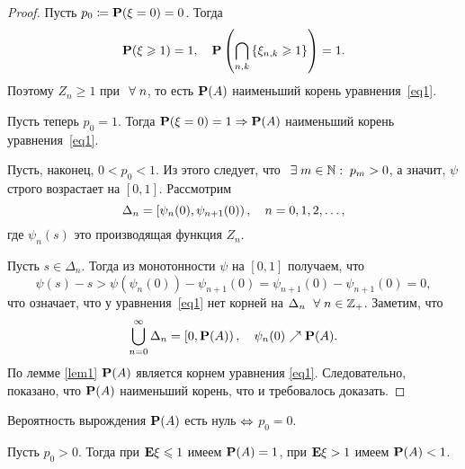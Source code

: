 \begin{proof}
	Пусть $p_0 \coloneqq \mathbf{P}(\xi = 0) = 0$.
	Тогда
	$$
		\mathbf{P}(\xi \geqslant 1) = 1, \quad \mathbf{P}\left(\bigcap\limits_{{n,k}} \left\{ \xi_{n,k} \geqslant 1\right\} \right) = 1.
	$$
	Поэтому $Z_n \ge 1$ при $~\forall\; n$, то есть $\mathbf{P}(A)$ \td наименьший корень уравнения~\eqref{eq1}.

	Пусть теперь $p_0 = 1$.
	Тогда $\mathbf{P}(\xi = 0)=1 \Rightarrow \mathbf{P}(A)$ \td наименьший корень уравнения~\eqref{eq1}.

	Пусть, наконец, $0 < p_{0} < 1$.
	Из этого следует, что $~\exists\; m\in\mathbb{N}:\; p_m > 0$, а значит, $\psi$ строго возрастает на $[0, 1]$.
	Рассмотрим
	$$
		\Delta_n = \left[\psi_{n}(0), \psi_{n + 1}(0)\right),\quad n = 0, 1, 2 ,\ldots ,
	$$
	где $\psi_n(s)$ \td это производящая функция $Z_n$.

	Пусть $s \in \Delta_n$.
	Тогда из монотонности $\psi$ на $[0, 1]$ получаем, что
	$$
		\psi(s) - s > \psi(\psi_n(0)) - \psi_{n + 1}(0)  =  \psi_{n + 1}(0) - \psi_{n + 1}(0) = 0,
	$$
	что означает, что у уравнения~\eqref{eq1} нет корней на $\Delta_n \; ~\forall\; n \in \mathbb{Z}_{+}$.
	Заметим, что
	$$
		\bigcup\limits_{n=0}^{\infty} \Delta_n = \left[0, \mathbf{P}(A)\right), \quad \psi_n(0) \nearrow \mathbf{P}(A).
	$$
	По лемме \ref{lem1} $\mathbf{P}(A)$ является корнем уравнения \eqref{eq1}.
	Следовательно, показано, что $\mathbf{P}(A)$ \td наименьший корень, что и требовалось доказать.
\end{proof}

\begin{theorem}
	\begin{points}{0}
		\item\label{firth} Вероятность вырождения $\mathbf{P}(A)$ есть нуль $\Leftrightarrow$ $p_{0} = 0$.
		\item\label{secth} Пусть $p_{0} > 0$.
			Тогда при $\mathbf{E} \xi \leqslant 1$ имеем $\mathbf{P} (A) = 1$,
			при $\mathbf{E} \xi > 1$ имеем $\mathbf{P}(A) < 1$.
	\end{points}
\end{theorem}

